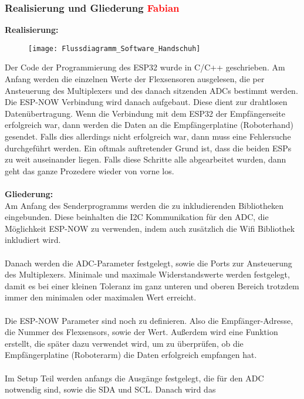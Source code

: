 \documentclass[11pt]{article}
\begin{document}
\subsubsection{Realisierung und Gliederung \textcolor{red}{Fabian}}
\textbf{Realisierung:}
\\
\begin{figure}[H]
	\begin{center}
		\scalebox{0.5}
		{\texttt{[image: Flussdiagramm\_Software\_Handschuh]}}
	\end{center}
\end{figure}
Der Code der Programmierung des ESP32 wurde in C/C++ geschrieben. Am Anfang werden die einzelnen Werte der Flexsensoren 
ausgelesen, die per Ansteuerung des Multiplexers und des danach sitzenden ADCs bestimmt werden. Die ESP-NOW Verbindung wird 
danach aufgebaut. Diese dient zur drahtlosen Datenübertragung. Wenn die Verbindung mit dem ESP32 der Empfängerseite erfolgreich 
war, dann werden die Daten an die Empfängerplatine (Roboterhand) gesendet. Falls dies allerdings nicht erfolgreich war, dann 
muss eine Fehlersuche durchgeführt werden. Ein oftmals auftretender Grund ist, dass die beiden ESPs zu weit auseinander liegen. 
Falls diese Schritte alle abgearbeitet wurden, dann geht das ganze Prozedere wieder von vorne los. \\
\\
\textbf{Gliederung:}
\\
Am Anfang des Senderprogramms werden die zu inkludierenden Bibliotheken eingebunden. Diese beinhalten die I2C Kommunikation für 
den ADC, die Möglichkeit ESP-NOW zu verwenden, indem auch zusätzlich die Wifi Bibliothek inkludiert wird. \\
\\
Danach werden die ADC-Parameter festgelegt, sowie die Ports zur Ansteuerung des Multiplexers. Minimale und maximale 
Widerstandswerte werden festgelegt, damit es bei einer kleinen Toleranz im ganz unteren und oberen Bereich trotzdem immer den 
minimalen oder maximalen Wert erreicht. \\
\\
Die ESP-NOW Parameter sind noch zu definieren. Also die Empfänger-Adresse, die Nummer des Flexsensors, sowie der Wert. Außerdem 
wird eine Funktion erstellt, die später dazu verwendet wird, um zu überprüfen, ob die Empfängerplatine (Roboterarm) die Daten 
erfolgreich empfangen hat. \\
\\
Im Setup Teil werden anfangs die Ausgänge festgelegt, die für den ADC notwendig sind, sowie die SDA und SCL. Danach wird das 
\end{document}
